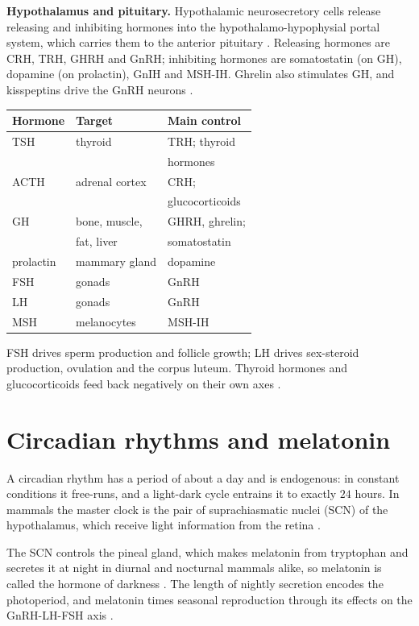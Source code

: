 \textbf{Hypothalamus and pituitary.}
Hypothalamic neurosecretory cells release
releasing and inhibiting hormones into
the hypothalamo-hypophysial portal
system, which carries them to the
anterior pituitary
\cite[Chapter 16]{hill2012animal}.
Releasing hormones are CRH, TRH, GHRH
and GnRH; inhibiting hormones are
somatostatin (on GH), dopamine (on
prolactin), GnIH and MSH-IH. Ghrelin
also stimulates GH, and kisspeptins drive
the GnRH neurons
\cite[Appendix K]{hill2012animal}.
\begin{center}
\begin{tabular}{lll}
Hormone & Target & Main control \\
\hline
TSH & thyroid & TRH; thyroid \\
 & & \quad hormones \\
ACTH & adrenal cortex & CRH; \\
 & & \quad glucocorticoids \\
GH & bone, muscle, & GHRH, ghrelin; \\
 & \quad fat, liver & \quad somatostatin \\
prolactin & mammary gland & dopamine \\
FSH & gonads & GnRH \\
LH & gonads & GnRH \\
MSH & melanocytes & MSH-IH \\
\end{tabular}
\end{center}
FSH drives sperm production and follicle
growth; LH drives sex-steroid production,
ovulation and the corpus luteum. Thyroid
hormones and glucocorticoids feed back
negatively on their own axes
\cite[Chapter 16, Appendix
K]{hill2012animal}.

\section{Circadian rhythms and melatonin}
\label{section-clocks}

A circadian rhythm has a period of about a
day and is endogenous: in constant
conditions it free-runs, and a light-dark
cycle entrains it to exactly $24$ hours.
In mammals the master clock is the pair
of suprachiasmatic nuclei (SCN) of the
hypothalamus, which receive light
information from the retina
\cite[Chapter 15]{hill2012animal}.

The SCN controls the pineal gland, which
makes melatonin from tryptophan and
secretes it at night in diurnal and
nocturnal mammals alike, so melatonin is
called the hormone of darkness
\cite[Chapter 15]{hill2012animal}. The
length of nightly secretion encodes the
photoperiod, and melatonin times seasonal
reproduction through its effects on the
GnRH-LH-FSH axis \cite[Chapter
17]{hill2012animal}.

